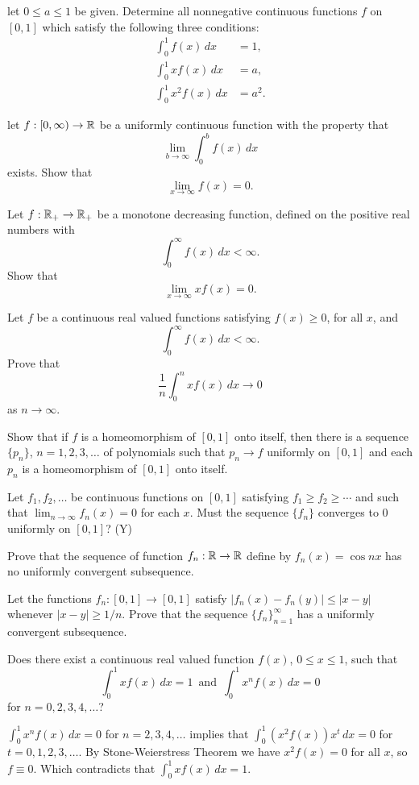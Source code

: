 \question[Fa85] let $0\leq a\leq 1$ be given. Determine all nonnegative continuous functions $f$ on $[0,1]$ which satisfy the following three conditions:
\begin{align*}
    \int_{0}^{1}{f(x)\,dx}&=1,\\
    \int_{0}^{1}{xf(x)\,dx}&=a,\\
    \int_{0}^{1}{x^2f(x)\,dx}&=a^2.
\end{align*}

\question[Fa83] let $f:[0,\infty)\to\mathbb{R}$ be a uniformly continuous function with the property that $$\lim_{b\to\infty}{\int_{0}^{b}{f(x)\,dx}}$$
exists. Show that $$\lim_{x\to\infty}{f(x)}=0.$$

\question[Sp83] Let $f:\mathbb{R}_+\to\mathbb{R}_+$ be a monotone decreasing function, defined  on the positive real numbers with $$\int_{0}^{\infty}{f(x)\,dx}<\infty.$$
Show that $$\lim_{x\to\infty}{xf(x)}=0.$$

\question[Fa90, Sp97] Let $f$ be a continuous real valued functions satisfying $f(x)\geq 0$, for all $x$, and $$\int_{0}^{\infty}{f(x)\,dx}<\infty.$$
Prove that $$\frac{1}{n}\int_{0}^{n}{xf(x)\,dx}\to 0$$ as $n\to\infty$.

\question[Fa84] Show that if $f$ is a homeomorphism of $[0,1]$ onto itself, then there is a sequence $\{p_n\}$, $n=1,2,3,\ldots$ of polynomials such that $p_n\to f$ uniformly on $[0,1]$ and each $p_n$ is a homeomorphism of $[0,1]$ onto itself.

\question[Fa82] Let $f_1, f_2, \ldots$ be continuous functions on $[0,1]$ satisfying $f_1\geq f_2\geq\cdots$ and such that $\lim_{n\to\infty}{f_n(x)}=0$ for each $x$. Must the sequence $\{f_n\}$ converges to 0 uniformly on $[0,1]$? (Y)

\question[Sp95] Prove that the sequence of function $f_n:\mathbb{R}\to\mathbb{R}$ define by $f_n(x)=\cos{nx}$ has no uniformly convergent subsequence.

\question[Sp01] Let the functions $f_n:[0,1]\to[0,1]$ satisfy $|f_n(x)-f_n(y)|\leq |x-y|$ whenever $|x-y|\geq 1/n$. Prove that the sequence $\{f_n\}_{n=1}^{\infty}$ has a uniformly convergent subsequence.

\question[Sp88] Does there exist a continuous real valued function $f(x)$, $0\leq x\leq 1$, such that $$\int_{0}^{1}{xf(x)\,dx}=1\,\,\,\text{and}\,\,\,\int_{0}^{1}{x^nf(x)\,dx}=0$$
for $n=0,2,3,4,\ldots$?
\begin{solution}
    $\displaystyle\int_{0}^{1}{x^nf(x)\,dx}=0$ for $n=2,3,4,\ldots$ implies that $\displaystyle\int_{0}^{1}{(x^2f(x))x^{t}\,dx}=0$ for $t=0,1,2,3,\ldots$. By Stone-Weierstress Theorem we have $x^2f(x)=0$ for all $x$, so $f\equiv 0$. Which contradicts that $\displaystyle\int_{0}^{1}{xf(x)\,dx}=1$.
\end{solution}

